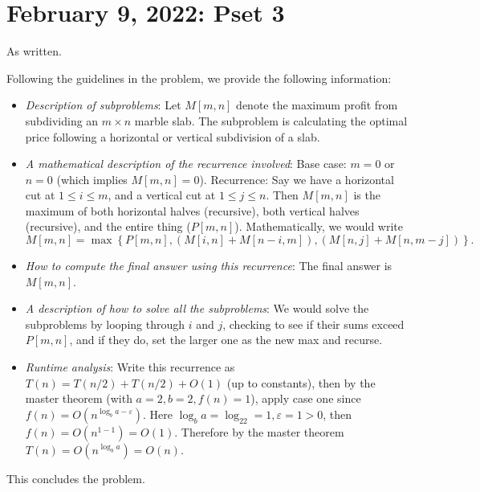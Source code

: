 \section{February 9, 2022: Pset 3} 
\begin{prob}
    As written.
\end{prob}
\begin{solution}
    Following the guidelines in the problem, we provide the following information:
    \begin{itemize}
    \setlength\itemsep{-.2em}
\item \emph{Description of subproblems}: Let $M[m,n]$ denote the maximum profit from subdividing an $m \times n$ marble slab. The subproblem is calculating the optimal price following a horizontal or vertical subdivision of a slab. 
\item \emph{A mathematical description of the recurrence involved}: Base case: $m=0$ or $n=0$ (which implies $M[m,n]=0$). Recurrence: Say we have a horizontal cut at $1 \leq i \leq m$, and a vertical cut at $1 \leq j \leq n$. Then $M[m,n] $ is the maximum of both horizontal halves (recursive), both vertical halves (recursive), and the entire thing ($P[m,n]$). Mathematically, we would write \[
        M[m,n]=\max \left\{ P[m,n],(M[i,n]+M[n-i,m]),(M[n,j]+M[n,m-j]) \right\}.
\] 
        \item \emph{How to compute the final answer using this recurrence}: The final answer is $M[m,n]$.
        \item \emph{A description of how to solve all the subproblems}: We would solve the subproblems by looping through $i$ and $j$, checking to see if their sums exceed $P[m,n]$, and if they do, set the larger one as the new max and recurse.
        \item \emph{Runtime analysis}: Write this recurrence as $T(n)=T(n /2) + T(n /2) +O(1)$ (up to constants), then by the master theorem (with $a=2,b=2,f(n)=1$), apply case one since $f(n)=O(n^{\log_ba-\varepsilon })$. Here $\log_ba=\log_22=1, \varepsilon =1>0$, then $f(n)=O(n^{1-1})=O(1)$. Therefore by the master theorem $T(n)=O(n^{\log_ba})=O(n)$.
    \end{itemize}
    This concludes the problem.
\end{solution}

